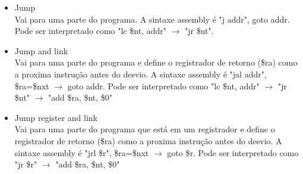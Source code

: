 \documentclass[a4paper, 10pt]{article}
\begin{document}
\begin{itemize}
	\item Jump\\
	Vai para uma parte do programa. A sintaxe assembly é "j addr", goto addr. Pode ser interpretado como "lc \$nt, addr" $\rightarrow$ "jr \$nt". 
	\item Jump and link\\
	Vai para uma parte do programa e define o registrador de retorno (\$ra) como a proxima instrução antes do desvio. A sintaxe assembly é "jal addr", \$ra=\$nxt $\rightarrow$ goto addr. Pode ser interpretado como "lc \$nt, addr" $\rightarrow$ "jr \$nt" $\rightarrow$ "add \$ra, \$nt, \$0"
	\item Jump register and link\\
	Vai para uma parte do programa que está em um registrador e define o registrador de retorno (\$ra) como a proxima instrução antes do desvio. A sintaxe assembly é "jrl \$r", \$ra=\$nxt $\rightarrow$ goto \$r. Pode ser interpretado como "jr \$r" $\rightarrow$ "add \$ra, \$nt, \$0"

\end{itemize}
\end{document}
